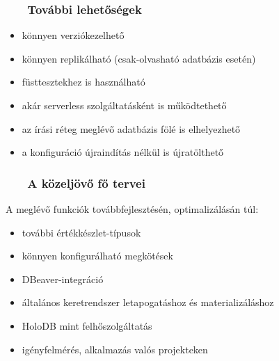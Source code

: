 \documentclass[
    aspectratio=169,
]{beamer}
\newcommand{\slidetitle}[2]{\frametitle{{\small #1 ~ \ding{226} ~ } \normalsize \textbf{#2} }}
\begin{document}
\begin{frame}
    \slidetitle{\sectionshorttitle}{További lehetőségek}
    
    \begin{itemize}
        \setlength\itemsep{1em}
        \item könnyen verziókezelhető
        \item könnyen replikálható (csak-olvasható adatbázis esetén)
        \item füsttesztekhez is használható
        \item akár serverless szolgáltatásként is működtethető
        \item az írási réteg meglévő adatbázis fölé is elhelyezhető
        \item a konfiguráció újraindítás nélkül is újratölthető
    \end{itemize}
\end{frame}

\begin{frame}
    \slidetitle{\sectionshorttitle}{A közeljövő fő tervei}

    A meglévő funkciók továbbfejlesztésén, optimalizálásán túl:
    
    \vspace{1em}
    
    \hspace*{\fill}%
    \begin{minipage}[t]{0.7\textwidth}
        \begin{itemize}
            \setlength\itemsep{1em}
            \item további értékkészlet-típusok
            \item könnyen konfigurálható megkötések
            \item DBeaver-integráció
            \item általános keretrendszer letapogatáshoz és materializáláshoz
            \item HoloDB mint felhőszolgáltatás
            \item igényfelmérés, alkalmazás valós projekteken
        \end{itemize}
    \end{minipage}
    \hspace*{\fill}%
    \begin{minipage}[t]{0.29\textwidth}
        \vspace{1cm}
        
        
    \end{minipage}
    \hspace*{\fill}%
\end{frame}
        
\end{document}
